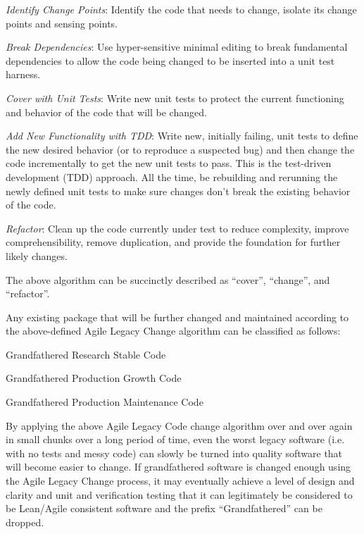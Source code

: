 \documentclass[11pt]{SANDreport}
\begin{document}
\begin{compactenum}

{}\item\textit{Identify Change Points}: Identify the code that needs
to change, isolate its change points and sensing points.

{}\item\textit{Break Dependencies}: Use hyper-sensitive minimal
editing to break fundamental dependencies to allow the code being
changed to be inserted into a unit test harness.

{}\item\textit{Cover with Unit Tests}: Write new unit tests to protect
the current functioning and behavior of the code that will be changed.

{}\item\textit{Add New Functionality with TDD}: Write new, initially
failing, unit tests to define the new desired behavior (or to reproduce
a suspected bug) and then change the code incrementally to get the new
unit tests to pass.  This is the test-driven development (TDD)
approach.  All the time, be rebuilding and rerunning the newly defined
unit tests to make sure changes don't break the existing behavior of
the code.

{}\item\textit{Refactor}: Clean up the code currently under test to
reduce complexity, improve comprehensibility, remove duplication, and
provide the foundation for further likely changes.

\end{compactenum}

The above algorithm can be succinctly described as ``cover'', ``change'', and
``refactor''.

Any existing package that will be further changed and maintained
according to the above-defined Agile Legacy Change algorithm can be
classified as follows:

\begin{compactenum}

{}\item Grandfathered Research Stable Code

{}\item Grandfathered Production Growth Code

{}\item Grandfathered Production Maintenance Code

\end{compactenum}

By applying the above Agile Legacy Code change algorithm over and over
again in small chunks over a long period of time, even the worst
legacy software (i.e. with no tests and messy code) can slowly be
turned into quality software that will become easier to change.  If
grandfathered software is changed enough using the Agile Legacy Change
process, it may eventually achieve a level of design and clarity and
unit and verification testing that it can legitimately be considered
to be Lean/Agile consistent software and the prefix ``Grandfathered''
can be dropped.
\end{document}
